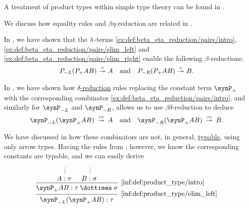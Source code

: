 \begin{comments}
  \item A treatment of product types within simple type theory can be found in \cite[\S 4.3.1]{Mimram2020ProgramEqualsProof}.

  \item We discuss how equality rules and \( \beta\eta \)-reduction are related in .
\end{comments}

\begin{remark}\label{rem:product_type_equality_rules}
  In , we have shown that the \( \mathrm{\lambda} \)-terms \ref{ex:def:beta_eta_reduction/pairs/intro}, \ref{ex:def:beta_eta_reduction/pairs/elim_left} and \ref{ex:def:beta_eta_reduction/pairs/elim_right} enable the following \( \beta \)-reductions:
  \begin{align}\label{eq:rem:product_type_equality_rules/beta}
    P_{-L} (P_+ A B) \bred* A
    &&
    \T{and}
    &&
    P_{-R} (P_+ A B) \bred* B.
  \end{align}

  In , we have shown how \hyperref[def:delta_reduction]{\( \delta \)-reduction} rules replacing the constant term \( \synP_+ \) with the corresponding combinator \ref{ex:def:beta_eta_reduction/pairs/intro}, and similarly for \( \synP_{-L} \) and \( \synP_{-R} \), allows us to use \( \beta\delta \)-reduction to deduce
  \begin{align*}
    \synP_{-L} (\synP_+ A B) \redrel*{\beta\delta} A
    &&
    \T{and}
    &&
    \synP_{-R} (\synP_+ A B) \redrel*{\beta\delta} B.
  \end{align*}

  We have discussed in  how these combinators are not, in general, \hyperref[def:typability]{typable}, using only arrow types. Having the rules from , however, we know the corresponding constants are typable, and we can easily derive
  \begin{equation*}
    \begin{prooftree}
      \hypo{}
      \ellipsis {} { A: \tau }

      \hypo{}
      \ellipsis {} { B: \sigma }

      \infer2[\ref{inf:def:product_type/intro}]{ \synP_+ AB: \tau \syntimes \sigma }

      \infer1[\ref{inf:def:product_type/elim_left}]{ \synP_{-L} (\synP_+ AB): \tau }
    \end{prooftree}
  \end{equation*}


\end{remark}
